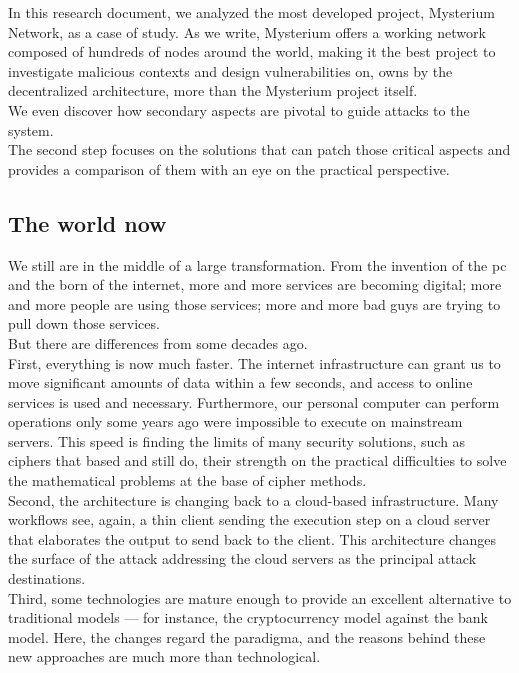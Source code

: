 \documentclass[]{article}
\begin{document}
    In this research document, we analyzed the most developed project, Mysterium Network, as a case of study. As we write, Mysterium offers a working network composed of hundreds of nodes around the world, making it the best project to investigate malicious contexts and design vulnerabilities on, owns by the decentralized architecture, more than the Mysterium project itself.\\
	We even discover how secondary aspects are pivotal to guide attacks to the system.\\
    The second step focuses on the solutions that can patch those critical aspects and provides a comparison of them with an eye on the practical perspective.
	
	\subsection{The world now}
	We still are in the middle of a large transformation. From the invention of the pc and the born of the internet, more and more services are becoming digital; more and more people are using those services; more and more bad guys are trying to pull down those services.\\

	But there are differences from some decades ago.\\
	First, everything is now much faster. The internet infrastructure can grant us to move significant amounts of data within a few seconds, and access to online services is used and necessary. Furthermore, our personal computer can perform operations only some years ago were impossible to execute on mainstream servers. This speed is finding the limits of many security solutions, such as ciphers that based and still do, their strength on the practical difficulties to solve the mathematical problems at the base of cipher methods.\\
	Second, the architecture is changing back to a cloud-based infrastructure. Many workflows see, again, a thin client sending the execution step on a cloud server that elaborates the output to send back to the client. This architecture changes the surface of the attack addressing the cloud servers as the principal attack destinations.\\
	Third, some technologies are mature enough to provide an excellent alternative to traditional models — for instance, the cryptocurrency model against the bank model. Here, the changes regard the paradigma, and the reasons behind these new approaches are much more than technological.\\
\end{document}
